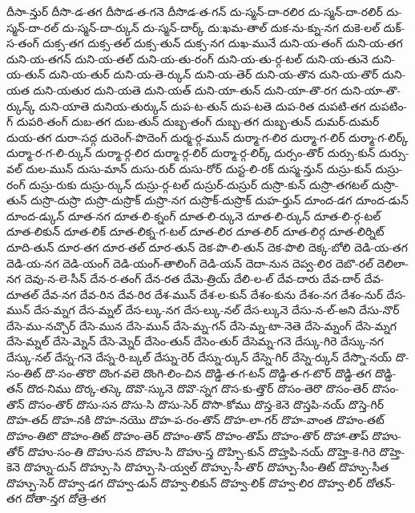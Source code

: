 {దీసా-న్తుర్
దీసొ-డ-తగ
దీసొడ-త-గనె
దీసొడ-త-గన్
దు-స్మన్-దా-రలిర
దు-స్మన్-దా-రలిర్
దు-స్మన్-దా-రల్
దు-స్మన్-దా-ర్కున్
దు-స్మన్-దార్క్
దుːఖమ-తాల్
దుక-ను-క్ను-నగ
దుకె-లల్
దుక్-స-తంగ్
దుక్స-తగ
దుక్స-తల్
దుక్స-తున్
దుక్స-నగ
దుఖ-మునే
దుని-య-తంగ్
దుని-య-తగ
దుని-య-తగన్
దుని-య-తల్
దుని-య-తు-రంగ్
దుని-య-తు-ర్గ-టల్
దుని-య-తునె
దుని-య-తున్
దుని-య-తుర్
దుని-య-తె-ర్కున్
దుని-య-తెర్
దుని-య-తొన
దుని-య-తొర్
దుని-యత
దుని-యతుర
దుని-యతె
దుని-యత్
దుని-యా-తున్
దుని-యా-తొ-రగ
దుని-యా-తొ-ర్కున్క్
దుని-యాతె
దునియ-తుర్కున్
దుప-ట-తున్
దుప-టతె
దుప-రిత
దుపటి-తగ
దుపటిం-గ్
దుపరి-తంగ్
దుబ-తగ
దుబ-తున్
దుబ్బ-తంగ్
దుబ్బ-తగ
దుబ్బ-తున్
దుమర్-దుమర్
దుయ-తగ
దురా-సద్గ
దురెంగ్-పొదెంగ్
దుర్మ-ర్గ-మున్
దుర్మా-గ-లిర
దుర్మా-గ-లిర్
దుర్మా-గ-లిర్క్
దుర్మా-ర-గ-లి-ర్కున్
దుర్మా-ర్గ-లిర
దుర్మా-ర్గ-లిర్
దుర్మా-ర్గ-లిర్క్
దుర్సం-తొర్
దుర్సు-కున్
దుర్సు-వల్
దుల-మున్
దుసు-మాన్
దుసు-రుర్
దుసు-రోర్
దుస్ట-లి-రక్
దుస్మ-న్తున్
దుస్రు-కున్
దుస్రు-రంగ్
దుస్రు-రుకు
దుస్రు-ర్కున్
దుస్రు-ర్గ-టల్
దుస్రుర్-దుస్రుర్
దుస్రొ-కున్
దుస్రొ-తగటల్
దుస్రొ-తున్
దుస్రొ-దుస్రొ
దుస్రొ-దుస్రొక్
దుస్రొ-నగ
దుస్రొక్-దుస్రొక్
దుహ-ర్తున్
దూంద-డగ
దూంద-డున్
దూంద-డ్కున్
దూత-నగ
దూత-లి-క్నంగ్
దూత-లి-ర్కునె
దూత-లి-ర్కున్
దూత-లి-ర్గ-టల్
దూత-లికున్
దూత-లిక్
దూత-లిక్న-గ-టల్
దూత-లిర
దూత-లిర్
దూత-లిర్గ
దూత-లిర్నిట్
దూది-తున్
దూర-తగ
దూర-తల్
దూర-తున్
దెక-పొ-లి-తున్
దెక-పొలి
దెక్క-బోలి
దెడి-య-తగ
దెడి-య-నగ
దెడి-యంగ్
దెడి-యంగ్-తాలింగ్
దెడి-యన్
దెదా-నున
దెప్వ-లిర
దెబొ-రల్
దెలిలా-నగ
దెవు-న-లె-సీన్
దేన-ర-తంగ్
దేన-రత
దేమె-త్రియ్
దేలి-ల-ల్
దేవ-దారు
దేవ-దార్
దేవ-దూతల్
దేవ-నగ
దేవ-రిన
దేవ-రిర
దేశ-మున్
దేశ-ల-కున్
దేశం-కును
దేశం-నగ
దేశం-నుర్
దేస-మున్
దేస-మ్నగ
దేస-మ్నల్
దేస-ల్కు-నగ
దేస-ల్కు-నల్
దేస-ల్కునె
దేసు-న-ల్-అని
దేసు-నొర్
దేసె-ము-నచ్చొర్
దేసె-మున
దేసె-మున్
దేసె-మ్న-గన్
దేసె-మ్న-టా-నెతె
దేసె-మ్నంగ్
దేసె-మ్నగ
దేసె-మ్నల్
దేసె-మ్నెన్
దేసె-మ్నెర్
దేసెం-తున్
దేసెం-తుర్
దేసెమ్న-గనె
దేస్కు-గిరె
దేస్కు-నగ
దేస్కు-నల్
దేస్న-గనె
దేస్న-రి-బ్కల్
దేస్ను-రెర్
దేస్ను-ర్కున్
దేస్నె-గిర్
దేస్నె-ర్కున్
దేస్నొ-నయ్
దొ-సం-తిట్
దొ-సం-తొరొ
దొంగ-వలె
దొంగి-లిం-చిన
దొడ్డి-త-గ-టన్
దొడ్డి-త-గ-టొర్
దొడ్డి-తగ
దొడ్డి-తన్
దొద-నిము
దొర్క-తస్కె
దొవొ-స్కునె
దొవొ-స్నగ
దొస-కు-త్తొర్
దొసం-తెరొ
దొసం-తెర్
దొసం-తొన్
దొసం-తొర్
దొసు-సన
దొసు-సి
దొసు-సెర్
దొసొ-కోము
దొస్త-కెనె
దొస్తపి-నయ్
దొస్తె-గిర్
దొహ-తద్
దొహ-నకి
దొహ-నయొ
దొహ-ప-రం-తొన్
దొహ-లా-గర్
దొహ-వాంత
దొహం-తట్
దొహం-తిటొ
దొహం-తిట్
దొహం-తెర్
దొహం-తొన్
దొహం-తొమ్
దొహం-తొర్
దొహా-తాప్
దొహు-తోర్
దొహు-సం-తి
దొహు-సన
దొహు-సి
దొహు-స్త
దొహ్చి-కున్
దొహ్తపి-నయ్
దొహ్తె-కె-గిరె
దొహ్తె-కెనె
దొహ్ను-దున్
దొహ్పు-సి
దొహ్పు-సి-య్వల్
దొహ్పు-సీ-తొర్
దొహ్పు-సీం-తిట్
దొహ్పు-సీత
దొహ్పు-సెర్
దొహ్వ-డగ
దొహ్వ-డున్
దొహ్వ-లికున్
దొహ్వ-లిక్
దొహ్వ-లిర
దొహ్వ-లిర్
దోతన్-తగ
దోతా-న్తగ
దోత్రె-తగ
}
